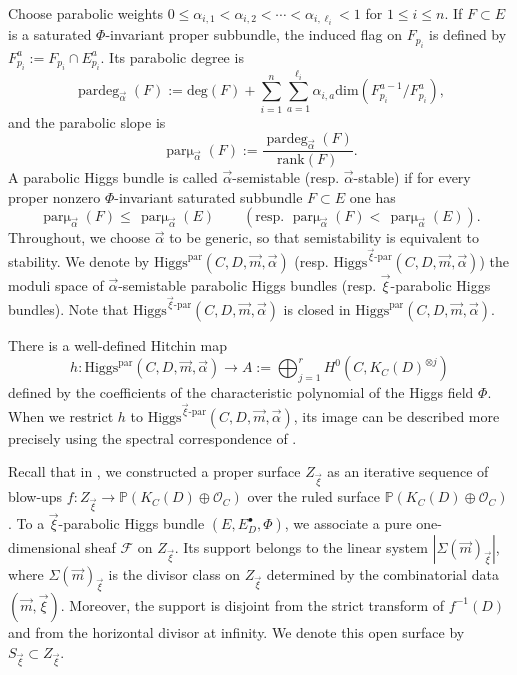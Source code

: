 \documentclass[11pt]{amsart}
\theoremstyle{plain}
\theoremstyle{definition}
\theoremstyle{remark}
\newcommand{\rk}{\operatorname{rk}}
\newcommand{\Higgs}{\mathrm{Higgs}}
\newcommand{\pardeg}{\operatorname{pardeg}}
\newcommand{\parmu}{\operatorname{par\mu}}
\def\a{\alpha}
\def\deg{\textrm{deg}}
\def\rk{\textrm{rank}}
\def\dim{\mathrm{dim}}
\def\vxi{\vec{\xi}}
\def\vm{\vec{m}}
\def\va{\vec{\a}}
\begin{document}
Choose parabolic weights $
0\le \alpha_{i,1}<\alpha_{i,2}<\cdots<\alpha_{i,\ell_i}<1$ for $1 \leq i \leq n$. If $F\subset E$ is a saturated $\Phi$-invariant proper subbundle, the induced flag on $F_{p_i}$ is defined by $F_{p_i}^a:=F_{p_i}\cap E_{p_i}^a.$ Its parabolic degree is
\[
\pardeg_{\vec\alpha}(F):=\deg(F)+\sum_{i=1}^n\sum_{a=1}^{\ell_i}\alpha_{i,a}\dim(F_{p_i}^{a-1}/F_{p_i}^{a}),
\]
and the parabolic slope is
\[
\parmu_{\vec\alpha}(F):=\frac{\pardeg_{\vec\alpha}(F)}{\rk(F)}.
\]
A parabolic Higgs bundle is called $\vec\alpha$-semistable (resp. $\vec\alpha$-stable) if for every proper nonzero $\Phi$-invariant saturated subbundle $F\subset E$ one has
\[
\parmu_{\vec\alpha}(F) \leq \,\parmu_{\vec\alpha}(E) \qquad (\text{resp. }\parmu_{\vec\alpha}(F) < \,\parmu_{\vec\alpha}(E)).
\]
Throughout, we choose $\vec\alpha$ to be generic, so that semistability is
equivalent to stability. We denote by
$\Higgs^{\mathrm{par}}(C,D,\vec m,\vec\alpha)$
(resp. $\Higgs^{\vec\xi\text{-par}}(C,D,\vec m,\vec\alpha)$) the moduli space
of $\vec\alpha$-semistable parabolic Higgs bundles
(resp. $\vec\xi$-parabolic Higgs bundles). Note that $\Higgs^{\vxi\text{-par}}(C,D,\vm,\va)$ is closed in $\Higgs^{\mathrm{par}}(C,D,\vec m,\vec\alpha)$. 

There is a well-defined Hitchin map
\[
h:\Higgs^{\text{par}}(C,D,\vec m,\vec\alpha)
\longrightarrow
A:=\bigoplus_{j=1}^r H^0(C,K_C(D)^{\otimes j})
\]
defined by the coefficients of the characteristic polynomial of the Higgs field $\Phi$. When we restrict $h$ to
$\Higgs^{\vec\xi\text{-par}}(C,D,\vec m,\vec\alpha)$, its image can be described
more precisely using the spectral correspondence of \cite[Section~3]{LeeLee2025}. 

Recall that in \cite[Section 3,4]{LeeLee2025}, we constructed a proper surface $Z_{\vec\xi}$ as an iterative sequence of blow-ups $f:Z_{\vec\xi}\to \mathbb P(K_C(D)\oplus\mathcal O_C)$ over the ruled surface $\mathbb P(K_C(D)\oplus\mathcal O_C)$. To a $\vec\xi$-parabolic Higgs bundle $(E,E_D^\bullet,\Phi)$, we associate a pure one-dimensional sheaf $\mathcal F$ on $Z_{\vec\xi}$. Its support belongs to the linear system $|\Sigma(\vec m)_{\vec\xi}|$, where $\Sigma(\vec m)_{\vec\xi}$ is the divisor class on $Z_{\vec\xi}$ determined by the combinatorial data $(\vec m,\vec\xi)$. Moreover, the support is disjoint from the strict transform of $f^{-1}(D)$ and from the horizontal divisor at infinity. We denote this open surface by $S_{\vec\xi}\subset Z_{\vec\xi}$.
\end{document}

